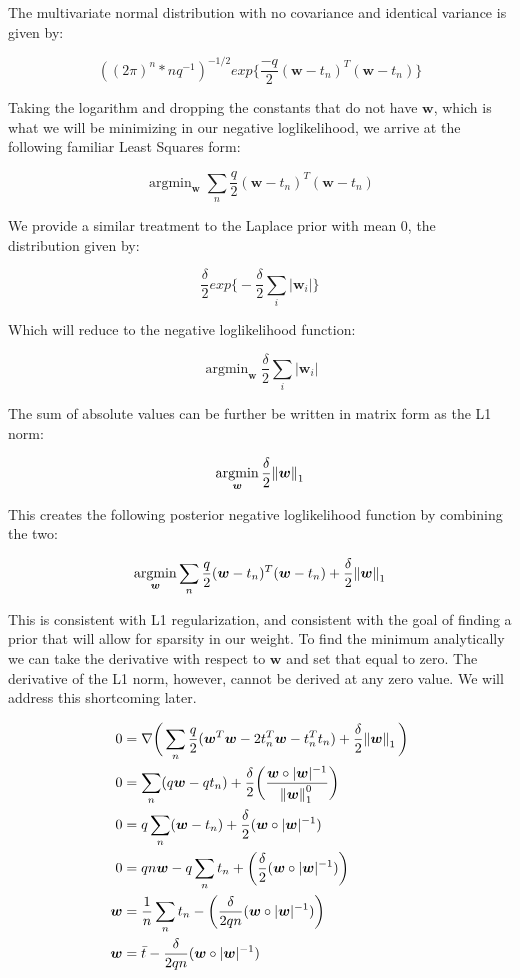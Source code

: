 \documentclass[a4paper,12pt]{article}\usepackage[]{graphicx}\usepackage[]{color}
\DeclareMathOperator*{\argmin}{argmin}
\begin{document}
The multivariate normal distribution with no covariance and identical variance is given by: 

$$
((2\pi)^n*nq^{-1})^{-1/2}exp\bigg\{ \frac{-q}{2}(\bm{w} - t_n)^{T}(\bm{w} - t_n) \bigg\}
$$

Taking the logarithm and dropping the constants that do not have $\bm{w}$, which is what we will be  minimizing in our negative loglikelihood, we arrive at the following familiar Least Squares form:

$$
\argmin_{\bm{w}} \sum_n \frac{q}{2}(\bm{w} - t_n)^{T}(\bm{w} - t_n)
$$

We provide a similar treatment to the Laplace prior with mean 0, the distribution given by: 

$$
\frac{\delta}{2} exp \bigg\{ -\frac{\delta}{2} \sum_i |\bm{w}_i| \bigg\}
$$

Which will reduce to the negative loglikelihood function:

$$
\argmin_{\bm{w}} \frac{\delta}{2} \sum_i |\bm{w}_i|
$$

The sum of absolute values can be further be written in matrix form as the L1 norm: 

$$
\argmin_{\bm{w}} \frac{\delta}{2} \norm{ \bm{w} }_1
$$

This creates the following posterior negative loglikelihood function by combining the two:

$$
\argmin_{\bm{w}} \sum_n \frac{q}{2}(\bm{w} - t_n)^{T}(\bm{w} - t_n) + \frac{\delta}{2} \norm{ \bm{w} }_1
$$

This is consistent with L1 regularization, and consistent with the goal of finding a prior that will allow for sparsity in our weight. To find the minimum analytically we can take the derivative with respect to $\bm{w}$ and set that equal to zero. The derivative of the L1 norm, however, cannot be derived at any zero value. We will address this shortcoming later.

\begin{align*}
0 &= \nabla \bigg(  \sum_n \frac{q}{2}(\bm{w}^T\bm{w} - 2t_n^T\bm{w} - t_n^Tt_n) + \frac{\delta}{2} \norm{ \bm{w} }_1  \bigg) \\
0 &=  \sum_n (q\bm{w} - qt_n) + \frac{\delta}{2} \bigg( \frac{\bm{w} \circ |\bm{w}|^{-1}}{ \norm{ \bm{w}}_1^{0} }  \bigg) \\ 
0 &=  q \sum_n (\bm{w} - t_n) + \frac{\delta}{2} ( \bm{w} \circ |\bm{w}|^{-1} ) \\
0 &=  qn\bm{w} - q\sum_n t_n + \bigg(\frac{\delta}{2} ( \bm{w} \circ |\bm{w}|^{-1} ) \bigg) \\
\bm{w} &=  \frac{1}{n} \sum_n t_n - \bigg( \frac{\delta}{2qn} ( \bm{w} \circ |\bm{w}|^{-1} ) \bigg) \\
  \bm{w} &=  \bar{t} - \frac{\delta}{2qn} ( \bm{w} \circ |\bm{w}|^{-1} )
\end{align*}
\end{document}
